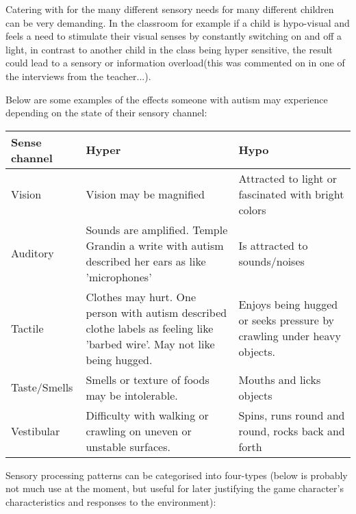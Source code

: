 \documentclass[11pt]{report}
\begin{document}
Catering with for the many different sensory needs for many different children can be very demanding. In the classroom for example if a child is hypo-visual and feels a need to stimulate their visual senses by constantly switching on and off a light, in contrast to another child in the class being hyper sensitive, the result could lead to a sensory or information overload(this was commented on in one of the interviews from the teacher...).

Below are some examples of the effects someone with autism may experience depending on the state of their sensory channel:

\begin{table}
    \begin{tabular}{| l | p{5cm} | p{5cm} |}
    \hline
    Sense channel & Hyper                                                                                                                      & Hypo                                                                   \\
    \hline
    \hline
    Vision        & Vision may be magnified                                                                                                    & Attracted to light or fascinated with bright colors                    \\
    \hline
    Auditory      & Sounds are amplified. Temple Grandin a write with autism described her ears as like 'microphones'                          & Is attracted to sounds/noises                                          \\
    \hline
    Tactile       & Clothes may hurt. One person with autism described clothe labels as feeling like 'barbed wire'. May not like being hugged. & Enjoys being hugged or seeks pressure by crawling under heavy objects. \\
    \hline
    Taste/Smells & Smells or texture of foods may be intolerable. & Mouths and licks objects \\
    \hline
    Vestibular & Difficulty with walking or crawling on uneven or unstable surfaces. & Spins, runs round and round, rocks back and forth \\
    \hline
    \end{tabular}
\end{table}

Sensory processing patterns can be categorised into four-types\cite{sensory_leisure} (below is probably not much use at the moment, but useful for later justifying the game character's characteristics and responses to the environment):
\end{document}
